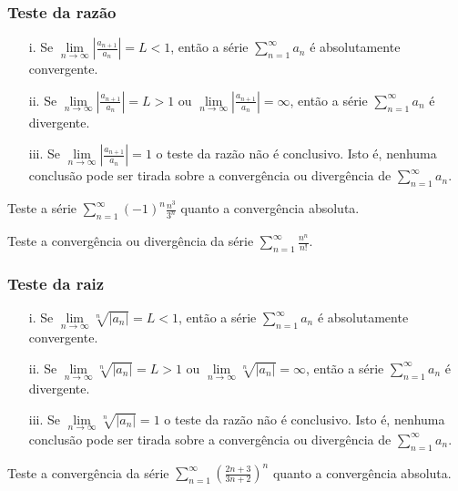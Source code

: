 \subsubsection{Teste da razão} 
\begin{itemize}
	\item[i.]Se $\lim\limits_{n\rightarrow\infty} \left| \frac{a_{n+1}}{a_{n}}\right|=L<1$, então a série $\sum_{n=1}^{\infty}a_{n}$ é absolutamente convergente.
	\item[ii.]Se $\lim\limits_{n\rightarrow\infty} \left| \frac{a_{n+1}}{a_{n}}\right|=L>1$ ou $\lim\limits_{n\rightarrow\infty} \left| \frac{a_{n+1}}{a_{n}}\right|=\infty$, então a série $\sum_{n=1}^{\infty}a_{n}$ é divergente.
	\item[iii.]Se $\lim\limits_{n\rightarrow\infty} \left| \frac{a_{n+1}}{a_{n}}\right|=1$ o teste da razão não é conclusivo. Isto é, nenhuma conclusão pode ser tirada sobre a convergência ou divergência de $\sum_{n=1}^{\infty}a_{n}$. 
\end{itemize} 
\begin{ex}
	Teste a série $\sum_{n=1}^{\infty}(-1)^{n}\frac{n^{3}}{3^{n}}$ quanto a convergência absoluta. 
\end{ex}
\vspace*{5cm}
\begin{ex}
	Teste a convergência ou divergência da série $\sum_{n=1}^{\infty}\frac{n^{n}}{n!}$. 
\end{ex}
\vspace*{5cm}
\subsubsection{Teste da raiz} 
\begin{itemize}
	\item[i.]Se $\lim\limits_{n\rightarrow\infty} \sqrt[n]{\left|a_{n} \right| }=L<1$, então a série $\sum_{n=1}^{\infty}a_{n}$ é absolutamente convergente.
	\item[ii.]Se $\lim\limits_{n\rightarrow\infty} \sqrt[n]{\left|a_{n} \right| }=L>1$ ou $\lim\limits_{n\rightarrow\infty} \sqrt[n]{\left|a_{n} \right| }=\infty$, então a série $\sum_{n=1}^{\infty}a_{n}$ é divergente.
	\item[iii.]Se $\lim\limits_{n\rightarrow\infty} \sqrt[n]{\left|a_{n} \right| }=1$ o teste da razão não é conclusivo. Isto é, nenhuma conclusão pode ser tirada sobre a convergência ou divergência de $\sum_{n=1}^{\infty}a_{n}$. 
\end{itemize}
\begin{ex}
	Teste a convergência da série $\sum_{n=1}^{\infty}(\frac{2n+3}{3n+2})^{n}$ quanto a convergência absoluta. 
\end{ex}

